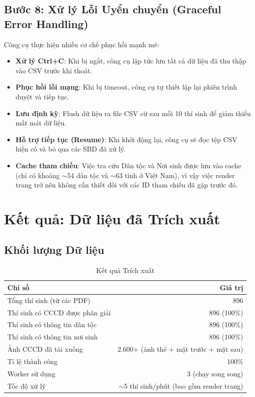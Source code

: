 \documentclass[12pt,a4paper]{article}
\begin{document}
\subsection{Bước 8: Xử lý Lỗi Uyển chuyển (Graceful Error Handling)}

Công cụ thực hiện nhiều cơ chế phục hồi mạnh mẽ:
\begin{itemize}
    \item \textbf{Xử lý Ctrl+C}: Khi bị ngắt, công cụ lập tức lưu tất cả dữ liệu đã thu thập vào CSV trước khi thoát.
    \item \textbf{Phục hồi lỗi mạng}: Khi bị timeout, công cụ tự thiết lập lại phiên trình duyệt và tiếp tục.
    \item \textbf{Lưu định kỳ}: Flush dữ liệu ra file CSV cứ sau mỗi 10 thí sinh để giảm thiểu mất mát dữ liệu.
    \item \textbf{Hỗ trợ tiếp tục (Resume)}: Khi khởi động lại, công cụ sẽ đọc tệp CSV hiện có và bỏ qua các SBD đã xử lý.
    \item \textbf{Cache tham chiếu}: Việc tra cứu Dân tộc và Nơi sinh được lưu vào cache (chỉ có khoảng $\sim$54 dân tộc và $\sim$63 tỉnh ở Việt Nam), vì vậy việc render trang trở nên không cần thiết đối với các ID tham chiếu đã gặp trước đó.
\end{itemize}

\section{Kết quả: Dữ liệu đã Trích xuất}
\label{sec:results}

\subsection{Khối lượng Dữ liệu}

\begin{table}[H]
\centering
\caption{Kết quả Trích xuất}
\begin{tabular}{@{}lr@{}}
\toprule
\textbf{Chỉ số} & \textbf{Giá trị} \\
\midrule
Tổng thí sinh (từ các PDF) & 896 \\
Thí sinh có CCCD được phân giải & 896 (100\%) \\
Thí sinh có thông tin dân tộc & 896 (100\%) \\
Thí sinh có thông tin nơi sinh & 896 (100\%) \\
Ảnh CCCD đã tải xuống & 2.600+ (ảnh thẻ + mặt trước + mặt sau) \\
Tỉ lệ thành công & 100\% \\
Worker sử dụng & 3 (chạy song song) \\
Tốc độ xử lý & $\sim$5 thí sinh/phút (bao gồm render trang) \\
\bottomrule
\end{tabular}
\end{table}
\end{document}
